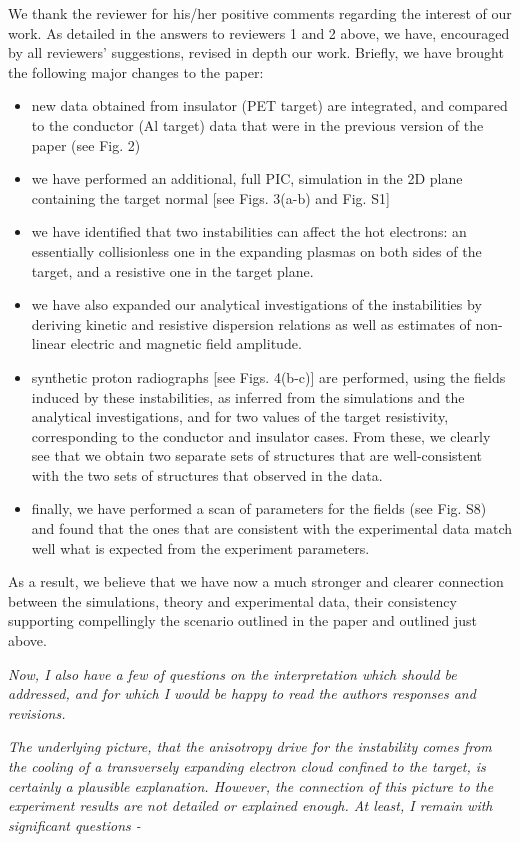 \documentclass{article}
\begin{document}
We thank the reviewer for his/her positive comments regarding the interest of our work. As detailed in the answers to reviewers 1 and 2 above, we have, encouraged by all reviewers’ suggestions, revised in depth our work.
Briefly, we have brought the following major changes to the paper:
\begin{itemize}
    \item new data obtained from insulator (PET target) are integrated, and compared to the conductor (Al target) data that were in the previous version of the paper (see Fig. 2)
    \item we have performed an additional, full PIC, simulation in the 2D plane containing the target normal [see Figs. 3(a-b) and Fig. S1]
    \item we have identified that two instabilities can affect the hot electrons: an essentially  collisionless one in the expanding plasmas on both sides of the target, and a resistive one in the target plane. 
    \item we have also expanded our analytical investigations of the instabilities by deriving kinetic and resistive dispersion relations as well as  estimates of    non-linear electric and magnetic field amplitude.
    \item synthetic proton radiographs [see Figs. 4(b-c)] are performed, using the fields induced by these instabilities, as inferred from the simulations and the analytical investigations, and for two values of the target resistivity, corresponding to the conductor and insulator cases. From these, we clearly see that we obtain two separate sets of structures that are well-consistent with the two sets of structures that observed in the data. 
    \item finally, we have performed a scan of parameters for the fields (see Fig. S8) and found that the ones that are consistent with the experimental data match well what is expected from the experiment parameters. 
\end{itemize}

As a result, we believe that we have now a much stronger and clearer connection between the simulations, theory and experimental data, their consistency supporting compellingly the scenario outlined in the paper and outlined just above.

\textit{
Now, I also have a few of questions on the interpretation which should be addressed, and for which I would be happy to read the authors responses and revisions.}

\textit{
The underlying picture, that the anisotropy drive for the instability comes from the cooling of a transversely expanding electron cloud confined to the target, is certainly a plausible explanation. However, the connection of this picture to the experiment results are not detailed or explained enough. At least, I remain with significant questions -}
\end{document}
